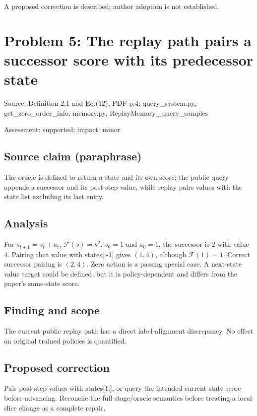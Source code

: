 \documentclass[11pt]{article}
\begin{document}
A proposed correction is described; author adoption is not established.

\section*{Problem 5: The replay path pairs a successor score with its predecessor state}

Source: Definition 2.1 and Eq.(12), PDF p.4; query\_system.py, get\_zero\_order\_info; memory.py, ReplayMemory.\_query\_samples

Assessment: supported; impact: minor

\subsection*{Source claim (paraphrase)}

The oracle is defined to return a state and its own score; the public query appends a successor and its post-step value, while replay pairs values with the state list excluding its last entry.

\subsection*{Analysis}

For \(s_{t+1}=s_t+a_t\), \(\mathcal F(s)=s^2\), \(s_0=1\) and \(a_0=1\), the successor is \(2\) with value \(4\). Pairing that value with states[:-1] gives \((1,4)\), although \(\mathcal F(1)=1\). Correct successor pairing is \((2,4)\). Zero action is a passing special case. A next-state value target could be defined, but it is policy-dependent and differs from the paper’s same-state score.

\subsection*{Finding and scope}

The current public replay path has a direct label-alignment discrepancy. No effect on original trained policies is quantified.

\subsection*{Proposed correction}

Pair post-step values with states[1:], or query the intended current-state score before advancing. Reconcile the full stage/oracle semantics before treating a local slice change as a complete repair.
\end{document}
